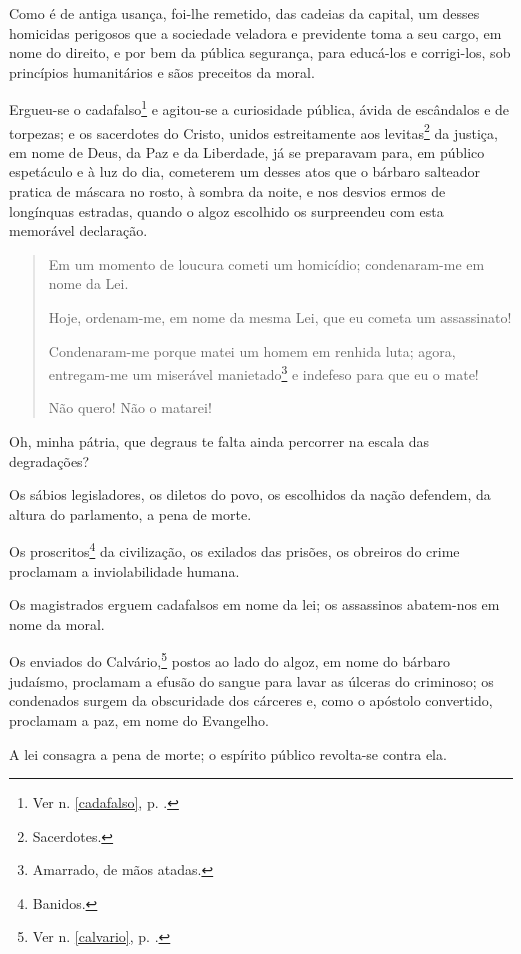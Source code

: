 Como é de antiga usança, foi-lhe remetido, das cadeias da capital, um
desses homicidas perigosos que a sociedade veladora e previdente toma a
seu cargo, em nome do direito, e por bem da pública segurança, para
educá-los e corrigi-los, sob princípios humanitários e sãos preceitos da
moral.

Ergueu-se o cadafalso\footnote{Ver n. \ref{cadafalso}, p. \pageref{cadafalso}.} 
e agitou-se a curiosidade pública, ávida de escândalos e de
torpezas; e os sacerdotes do Cristo, unidos estreitamente aos
levitas\footnote{Sacerdotes.} da justiça, em nome de Deus, da Paz e da
Liberdade, já se preparavam para, em público espetáculo e à luz do dia,
cometerem um desses atos que o bárbaro salteador pratica de máscara no
rosto, à sombra da noite, e nos desvios ermos de longínquas estradas,
quando o algoz escolhido os surpreendeu com esta memorável declaração.


\begin{quote}
Em um momento de loucura cometi um homicídio; condenaram-me em nome da
Lei.

Hoje, ordenam-me, em nome da mesma Lei, que eu cometa um assassinato!

Condenaram-me porque matei um homem em renhida luta; agora, entregam-me
um miserável manietado\footnote{Amarrado, de mãos atadas.} e indefeso
para que eu o mate!

Não quero! Não o matarei!
\end{quote}

Oh, minha pátria, que degraus te falta ainda percorrer na escala das
degradações?

Os sábios legisladores, os diletos do povo, os escolhidos da nação
defendem, da altura do parlamento, a pena de morte.

Os proscritos\footnote{Banidos.} da civilização, os exilados das
prisões, os obreiros do crime proclamam a inviolabilidade humana.

Os magistrados erguem cadafalsos em nome da lei; os assassinos
abatem-nos em nome da moral.

Os enviados do Calvário,\footnote{Ver n. \ref{calvario}, p. \pageref{calvario}.} 
postos ao lado do algoz, em nome do bárbaro judaísmo,
proclamam a efusão do sangue para lavar as úlceras do criminoso; os
condenados surgem da obscuridade dos cárceres e, como o apóstolo
convertido, proclamam a paz, em nome do Evangelho.

A lei consagra a pena de morte; o espírito público revolta-se contra
ela.

